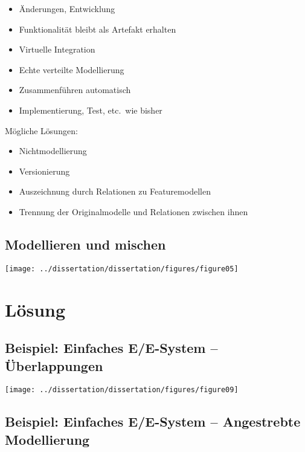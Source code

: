 	\begin{itemize}
		\item Änderungen, Entwicklung
		\item Funktionalität bleibt als Artefakt erhalten
		\item Virtuelle Integration
		\item Echte verteilte Modellierung
		\item Zusammenführen automatisch
		\item Implementierung, Test, etc.\ wie bisher
	\end{itemize}

	Mögliche Lösungen:

	\begin{itemize}
		\item Nichtmodellierung
		\item Versionierung
		\item Auszeichnung durch Relationen zu Featuremodellen
		\item Trennung der Originalmodelle und Relationen zwischen ihnen
	\end{itemize}

	\subsection{Modellieren und mischen}

	\begin{frame}{\insertsectionhead}{\insertsubsectionhead}
		\hfil\texttt{[image: ../dissertation/dissertation/figures/figure05]}\hfil
	\end{frame}

	\section{Lösung}

	\subsection{Beispiel: Einfaches E/E-System -- Überlappungen}

	\begin{frame}{\insertsectionhead}{\insertsubsectionhead}
		\hfil\texttt{[image: ../dissertation/dissertation/figures/figure09]}\hfil
	\end{frame}

	\subsection{Beispiel: Einfaches E/E-System -- Angestrebte Modellierung}

